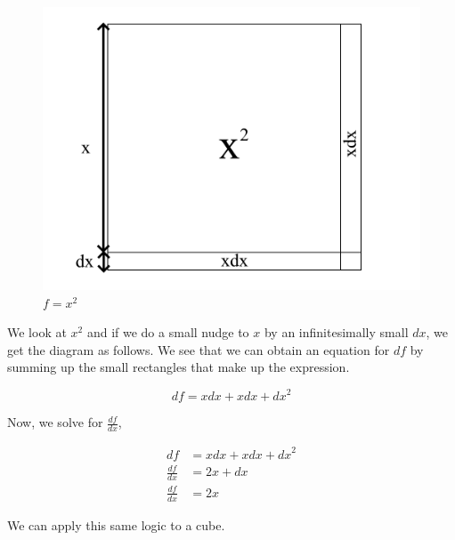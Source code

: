 \documentclass[a4paper,12pt,oneside]{book}
\begin{document}
\begin{figure}[H]
    \begin{center}
        \includegraphics[scale=0.35]{img/zayan/pr1.png}
        \caption{$f=x^2$}
        \label{fig:pr1}
    \end{center}
\end{figure}

 \noindent We look at $x^2$ and if we do a small nudge to $x$ by an infinitesimally small $dx$, we get the diagram as follows. We see that we can obtain an equation for $df$ by summing up the small rectangles that make up the expression.

$$df=xdx+xdx+{dx}^2$$

 \noindent Now, we solve for $\frac{df}{dx}$,
 
$$
\begin{aligned}
df&=xdx+xdx+{dx}^2\\
\frac{df}{dx}&=2x+dx\\
\frac{df}{dx}&=2x
\end{aligned}$$

\noindent We can apply this same logic to a cube.
\end{document}
